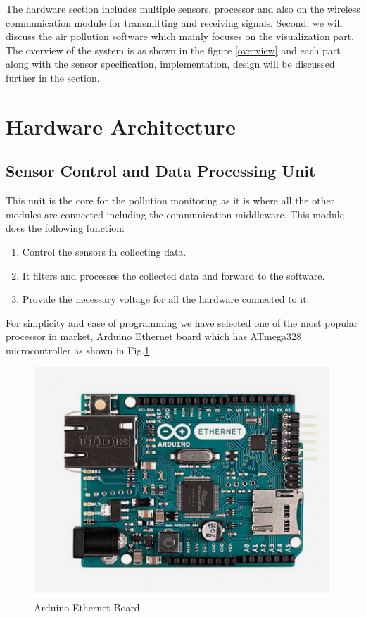    The hardware section includes multiple sensors, processor and also on the wireless communication module for transmitting and receiving signals. Second, we will discuss the air pollution software which mainly focuses on the visualization part. The overview of the system is as shown in the figure \ref{overview} and each part along with the sensor specification, implementation, design will be discussed further in the section. 


 \section{Hardware Architecture}
  
 \subsection{Sensor Control and Data Processing Unit}
This unit is the core for the pollution monitoring as it is where all the other modules are connected including the communication middleware. This module does the following function:


\begin{enumerate}

\item Control the sensors in collecting data.
\item It filters and processes the collected data and forward to the software.
\item Provide the necessary voltage for all the hardware connected to it.

\end{enumerate}
For simplicity and ease of programming we have selected one of the most popular processor in market, Arduino Ethernet board which has ATmega328 microcontroller as shown in Fig.\ref{Arduino}. 

\begin{figure}[h]
  \begin{center}
  \includegraphics[scale=0.80]{./images/figure3.png}
  \end{center}
  \caption{Arduino Ethernet Board}
  \label{Arduino}
\end{figure}

